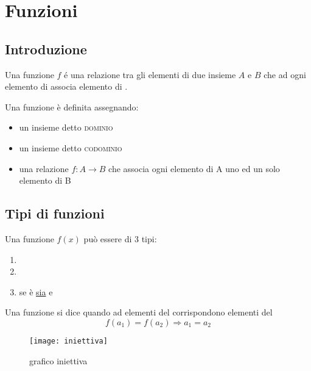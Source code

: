 \documentclass[../appunti.tex]{subfiles}
\begin{document}
\section{Funzioni}
\subsection{Introduzione}

\begin{defn}
Una funzione $f$ é una relazione tra gli elementi di due insieme $A$ e $B$ che ad ogni elemento di  associa  elemento di .
\end{defn}


Una funzione è definita assegnando:
\begin{itemize}
\item un insieme  detto  \textsc{dominio}
\item un insieme  detto \textsc{codominio}
\item una relazione $f: A \rightarrow B$ che associa ogni elemento di A uno ed un solo elemento di B
\end{itemize}


\subsection{Tipi di funzioni}

Una funzione $f(x)$ può essere di 3 tipi:
\begin{enumerate}
    \item {}
    \item {}
    \item {} se è \underline{sia}  e  
    \end{enumerate}

    \begin{defn} Una funzione si dice  quando ad elementi  del  corrispondono elementi  del 
\begin{equation}
  f(a_1) = f(a_2) \Rightarrow a_1 = a_2
\end{equation}

\begin{figure}[ht]
	\center
	\texttt{[image: iniettiva]}
	\caption{grafico iniettiva}
	\label{fig:grafico_iniettiva}
\end{figure}
\end{defn}
\noindent
\end{document}
